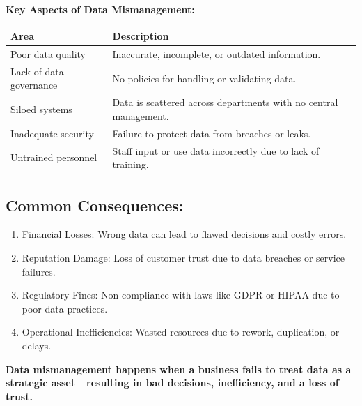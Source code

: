 \documentclass[
  man,
  floatsintext,
  longtable,
  nolmodern,
  notxfonts,
  notimes,
  colorlinks=true,linkcolor=blue,citecolor=blue,urlcolor=blue]{apa7}
\begin{document}
\textbf{Key Aspects of Data Mismanagement:}

\begin{longtable}[]{@{}
  >{\raggedright\arraybackslash}p{}
  >{\raggedright\arraybackslash}p{}@{}}
\toprule\noalign{}
\begin{minipage}[b]{\linewidth}\raggedright
Area
\end{minipage} & \begin{minipage}[b]{\linewidth}\raggedright
Description
\end{minipage} \\
\midrule\noalign{}
\endhead
\bottomrule\noalign{}
\endlastfoot
Poor data quality & Inaccurate, incomplete, or outdated information. \\
Lack of data governance & No policies for handling or validating
data. \\
Siloed systems & Data is scattered across departments with no central
management. \\
Inadequate security & Failure to protect data from breaches or leaks. \\
Untrained personnel & Staff input or use data incorrectly due to lack of
training. \\
\end{longtable}

\subsection{\texorpdfstring{\textbf{Common
Consequences:}}{Common Consequences:}}\label{common-consequences}

\begin{enumerate}
\def\labelenumi{\arabic{enumi}.}
\item
  Financial Losses: Wrong data can lead to flawed decisions and costly
  errors.
\item
  Reputation Damage: Loss of customer trust due to data breaches or
  service failures.
\item
  Regulatory Fines: Non-compliance with laws like GDPR or HIPAA due to
  poor data practices.
\item
  Operational Inefficiencies: Wasted resources due to rework,
  duplication, or delays.
\end{enumerate}

\textbf{Data mismanagement happens when a business fails to treat data
as a strategic asset---resulting in bad decisions, inefficiency, and a
loss of trust.}
\end{document}
